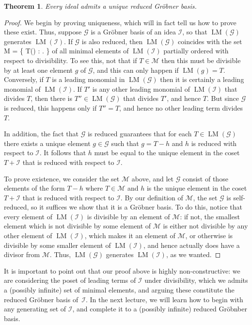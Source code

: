 \documentclass[fleqn, a4paper, twoside]{article}
\makeatletter
\newcommand{\leadm}[1]{\operatorname{LM}(#1)}
\newcommand{\0}{\langle 0\rangle}
\newcommand{\II}{\mathcal{I}}
\newcommand{\GG}{\mathcal G}
\let\[\@undefined
\DeclareRobustCommand{\[}{\begin{equation}}%
\let\]\@undefined
\DeclareRobustCommand{\]}{\end{equation}}%
\theoremstyle{mytheorem}
\newtheorem{theorem}{Theorem}[section]
\theoremstyle{introthm}
\theoremstyle{mydefinition}
\theoremstyle{mydefinition2}
\theoremstyle{plain} %
\newcommand{\?}{\,?\,}
\theoremstyle{mytheorem}
\theoremstyle{plain} %
\makeatother
\begin{document}
\begin{theorem}
Every ideal admits a unique reduced Gr\"obner basis.
\end{theorem}

\begin{proof}
We begin by proving uniqueness, which will in fact tell us
how to prove these exist. Thus, suppose $\GG$ is a 
Gr\"obner basis of an idea $\II$, so that
$\leadm{\GG}$ generates $\leadm{\II}$. If $\GG$ is
also reduced, then $\leadm{\GG}$ coincides with the set
\[ 
 \mathcal M = \{ T\in \leadm{\II} : \text{$T$ is not divisible by any
 other element of  $\leadm{\II}$}.
 	\}
	\]
of all minimal elements of $\leadm{\II}$ partially ordered
with respect to divisibility. To see this, not that if
$T\in \mathcal M$ then this must be divisible by at least
one element $g$ of $\GG$, and this can only happen 
if $\leadm{g} = T$. Conversely, if $T$ is a leading monomial
in $\leadm{\GG}$ then it is certainly a leading monomial
of $\leadm{\II}$. If $T'$ is any other
leading monomial of $\leadm{\II}$ that divides $T$, then there is
$T''\in \leadm{\GG}$ that divides $T'$, and hence $T$. But
since $\GG$ is reduced, this happens only if $T''=T$, and
hence no other leading term divides $T$.

In addition, the fact that $\GG$ is reduced guarantees
that for each $T\in\leadm{\GG}$ there exists a unique element
$g\in\GG$ such that $g= T-h$ and $h$ is reduced with
respect to $\II$. It follows that $h$ must be equal to the
unique element in the coset $T+\II$ that is reduced
with respect to $\II$.

To prove existence, we consider the set $\mathcal{M}$ above,
and let $\GG$ consist of those elements of the form $T-h$
where $T\in \mathcal{M}$ and $h$ is the unique element in
the coset $T+\II$ that is reduced with respect to $\II$. 
By our definition of $\mathcal M$, the set $\GG$ is self-reduced, 
so it suffices we show that it is a Gr\"obner basis. 
To do this, notice that every element of $\leadm{\II}$
is divisible by an element of $\mathcal M$: if not,
the smallest element which is not divisible by some
element of $\mathcal M$ is either not divisible by
any other element of $\leadm{\II}$, which makes it an element
of $\mathcal M$, or otherwise is divisible by some
smaller element of $\leadm{\II}$, and hence actually
does have a divisor from $\mathcal M$. Thus,
$\leadm{\GG}$ generates $\leadm{\II}$, as we wanted.
\end{proof}

It is important to point out that our proof above is highly
non-constructive: we are considering the poset of
leading terms of $\II$ under divisibility, 
which we admits a (possibly infinite) set of 
minimal elements, and arguing these constitute the
reduced Gr\"obner basis of~$\II$. In the next
lecture, we will learn how to begin with any generating
set of $\II$, and complete it to a (possibly infinite)
reduced Gr\"obnber basis.
 
\end{document}
